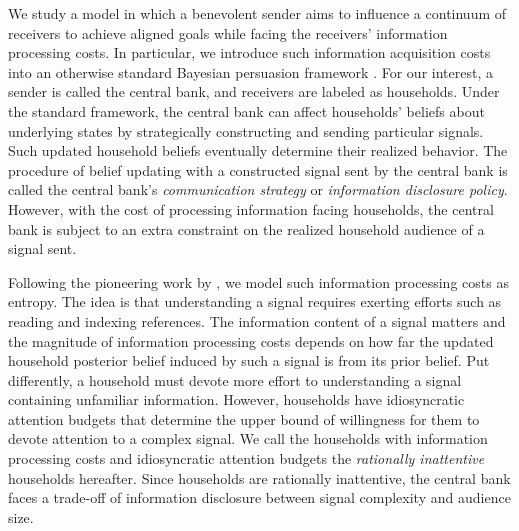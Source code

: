\documentclass[12pt,a4paper]{article}
\begin{document}
We study a model in which a benevolent sender aims to influence a continuum of receivers to achieve aligned goals while facing the receivers' information processing costs. In particular, we introduce such information acquisition costs into an otherwise standard Bayesian persuasion framework \citep{KG2011}. For our interest, a sender is called the central bank, and receivers are labeled as households. Under the standard framework, the central bank can affect households' beliefs about underlying states by strategically constructing and sending particular signals. Such updated household beliefs eventually determine their realized behavior. The procedure of belief updating with a constructed signal sent by the central bank is called the central bank's \textit{communication strategy} or \textit{information disclosure policy}. However, with the cost of processing information facing households, the central bank is subject to an extra constraint on the realized household audience of a signal sent. 

Following the pioneering work by \cite{Sims2003}, we model such information processing costs as entropy. The idea is that understanding a signal requires exerting efforts such as reading and indexing references. The information content of a signal matters and the magnitude of information processing costs depends on how far the updated household posterior belief induced by such a signal is from its prior belief. Put differently, a household must devote more effort to understanding a signal containing unfamiliar information. However, households have idiosyncratic attention budgets that determine the upper bound of willingness for them to devote attention to a complex signal. We call the households with information processing costs and idiosyncratic attention budgets the \textit{rationally inattentive} households hereafter. Since households are rationally inattentive, the central bank faces a trade-off of information disclosure between signal complexity and audience size.
\end{document}
